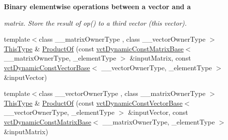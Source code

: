 \begin{Indent}{\bf Binary elementwise operations between a vector and a}\par
{\em matrix. Store the result of op() to a third vector (this vector). }\begin{DoxyCompactItemize}
\item 
{\footnotesize template$<$class \-\_\-\-\_\-matrix\-Owner\-Type , class \-\_\-\-\_\-vector\-Owner\-Type $>$ }\\\hyperlink{classvct_dynamic_const_vector_base_a39da273523717f678f54d3321ebca3dd}{This\-Type} \& \hyperlink{classvct_dynamic_vector_base_aae3e15da4eae6cb4df0d982984b2de42}{Product\-Of} (const \hyperlink{classvct_dynamic_const_matrix_base}{vct\-Dynamic\-Const\-Matrix\-Base}$<$ \-\_\-\-\_\-matrix\-Owner\-Type, \-\_\-element\-Type $>$ \&input\-Matrix, const \hyperlink{classvct_dynamic_const_vector_base}{vct\-Dynamic\-Const\-Vector\-Base}$<$ \-\_\-\-\_\-vector\-Owner\-Type, \-\_\-element\-Type $>$ \&input\-Vector)
\item 
{\footnotesize template$<$class \-\_\-\-\_\-vector\-Owner\-Type , class \-\_\-\-\_\-matrix\-Owner\-Type $>$ }\\\hyperlink{classvct_dynamic_const_vector_base_a39da273523717f678f54d3321ebca3dd}{This\-Type} \& \hyperlink{classvct_dynamic_vector_base_ad86a700afbc9feafd2cec7b61db67706}{Product\-Of} (const \hyperlink{classvct_dynamic_const_vector_base}{vct\-Dynamic\-Const\-Vector\-Base}$<$ \-\_\-\-\_\-vector\-Owner\-Type, \-\_\-element\-Type $>$ \&input\-Vector, const \hyperlink{classvct_dynamic_const_matrix_base}{vct\-Dynamic\-Const\-Matrix\-Base}$<$ \-\_\-\-\_\-matrix\-Owner\-Type, \-\_\-element\-Type $>$ \&input\-Matrix)
\end{DoxyCompactItemize}
\end{Indent}
